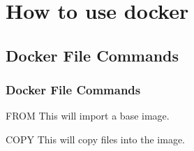 \documentclass{beamer}
\begin{document}
\section{How to use docker} 
\subsection{Docker File Commands} 
\begin{frame}
\frametitle{Docker File Commands}
\begin{block}{FROM}
This will import a base image.
\end{block}

\begin{block}{COPY}
This will copy files into the image.
\end{block}

\end{frame}

\end{document}
